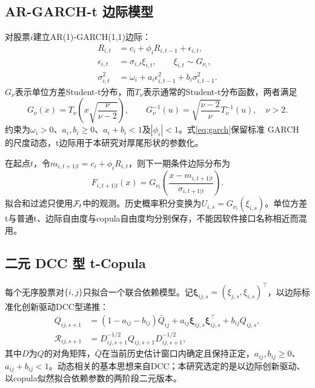 \subsection{AR-GARCH-t 边际模型}
对股票$i$建立AR(1)-GARCH(1,1)边际：
\begin{align}
R_{i,t}&=c_i+\phi_iR_{i,t-1}+\epsilon_{i,t},\label{eq:ar}\\
\epsilon_{i,t}&=\sigma_{i,t}\xi_{i,t},\qquad \xi_{i,t}\sim G_{\nu_i},\label{eq:innov}\\
\sigma_{i,t}^{2}&=\omega_i+a_i\epsilon_{i,t-1}^{2}+b_i\sigma_{i,t-1}^{2}.\label{eq:garch}
\end{align}
$G_{\nu}$表示单位方差Student-t分布，而$T_{\nu}$表示通常的Student-t分布函数，两者满足
\begin{equation}\label{eq:unit_t}
G_{\nu}(x)=T_{\nu}\!\left(x\sqrt{\frac{\nu}{\nu-2}}\right),\qquad
G_{\nu}^{-1}(u)=\sqrt{\frac{\nu-2}{\nu}}T_{\nu}^{-1}(u),\quad \nu>2.
\end{equation}
约束为$\omega_i>0$、$a_i,b_i\geq0$、$a_i+b_i<1$及$|\phi_i|<1$。式\eqref{eq:garch}保留标准 GARCH 的尺度动态\cite{bollerslev1986}，t边际用于本研究对厚尾形状的参数化。

在起点$t$，令$m_{i,t+1|t}=c_i+\phi_iR_{i,t}$，则下一期条件边际分布为
\begin{equation}\label{eq:forecast_margin}
F_{i,t+1|t}(x)=G_{\nu_i}\!\left(\frac{x-m_{i,t+1|t}}{\sigma_{i,t+1|t}}\right).
\end{equation}
拟合和过滤只使用$\mathcal F_t$中的观测。历史概率积分变换为$U_{i,s}=G_{\nu_i}(\xi_{i,s})$。单位方差t与普通t、边际自由度与copula自由度均分别保存，不能因软件接口名称相近而混用。

\subsection{二元 DCC 型 t-Copula}
每个无序股票对$\{i,j\}$只拟合一个联合依赖模型。记$\boldsymbol\xi_{ij,s}=(\xi_{j,s},\xi_{i,s})^\top$，以边际标准化创新驱动DCC型递推：
\begin{align}
Q_{ij,s+1}&=(1-a_{ij}-b_{ij})\bar Q_{ij}
+a_{ij}\boldsymbol\xi_{ij,s}\boldsymbol\xi_{ij,s}^{\top}+b_{ij}Q_{ij,s},\label{eq:dcc}\\
\mathcal R_{ij,s+1}&=D_{ij,s+1}^{-1/2}Q_{ij,s+1}D_{ij,s+1}^{-1/2},\label{eq:dccnorm}
\end{align}
其中$D$为$Q$的对角矩阵，$\bar Q$在当前历史估计窗口内确定且保持正定，$a_{ij},b_{ij}\geq0$、$a_{ij}+b_{ij}<1$。动态相关的基本思想来自DCC\cite{engle2002}；本研究选定的是以边际创新驱动、以copula似然拟合依赖参数的两阶段二元版本。

